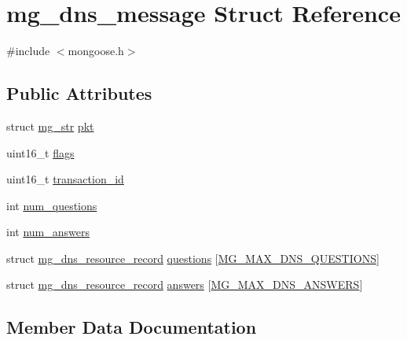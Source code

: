 \hypertarget{structmg__dns__message}{}\section{mg\+\_\+dns\+\_\+message Struct Reference}
\label{structmg__dns__message}


{\ttfamily \#include $<$mongoose.\+h$>$}

\subsection*{Public Attributes}
\begin{DoxyCompactItemize}
\item 
struct \hyperlink{structmg__str}{mg\+\_\+str} \hyperlink{structmg__dns__message_ae8543b2a3044c785b4bf0dc4fc39beff_ae8543b2a3044c785b4bf0dc4fc39beff}{pkt}
\item 
uint16\+\_\+t \hyperlink{structmg__dns__message_a87f916bb55651d46ce74f930a5e08327_a87f916bb55651d46ce74f930a5e08327}{flags}
\item 
uint16\+\_\+t \hyperlink{structmg__dns__message_afb4a01337779347f74a214c7a273ebcb_afb4a01337779347f74a214c7a273ebcb}{transaction\+\_\+id}
\item 
int \hyperlink{structmg__dns__message_a035ced22ef43b6b23ad6df3ad3aad126_a035ced22ef43b6b23ad6df3ad3aad126}{num\+\_\+questions}
\item 
int \hyperlink{structmg__dns__message_a6ebecefbdcb5c292f439123b7c780517_a6ebecefbdcb5c292f439123b7c780517}{num\+\_\+answers}
\item 
struct \hyperlink{structmg__dns__resource__record}{mg\+\_\+dns\+\_\+resource\+\_\+record} \hyperlink{structmg__dns__message_a866a83825f2daa4043aa20acded4f007_a866a83825f2daa4043aa20acded4f007}{questions} \mbox{[}\hyperlink{mongoose_8h_a84f36ff9caf50e0d70d10244a2c64b45_a84f36ff9caf50e0d70d10244a2c64b45}{M\+G\+\_\+\+M\+A\+X\+\_\+\+D\+N\+S\+\_\+\+Q\+U\+E\+S\+T\+I\+O\+NS}\mbox{]}
\item 
struct \hyperlink{structmg__dns__resource__record}{mg\+\_\+dns\+\_\+resource\+\_\+record} \hyperlink{structmg__dns__message_a76e7c9d2d5f7f621df2d2551f0163e01_a76e7c9d2d5f7f621df2d2551f0163e01}{answers} \mbox{[}\hyperlink{mongoose_8h_a1832d47a93efb88b807286ed1ae80646_a1832d47a93efb88b807286ed1ae80646}{M\+G\+\_\+\+M\+A\+X\+\_\+\+D\+N\+S\+\_\+\+A\+N\+S\+W\+E\+RS}\mbox{]}
\end{DoxyCompactItemize}


\subsection{Member Data Documentation}
\mbox{\label{structmg__dns__message_a76e7c9d2d5f7f621df2d2551f0163e01_a76e7c9d2d5f7f621df2d2551f0163e01}} 
